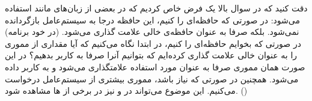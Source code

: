 دقت کنید که در سوال بالا یک فرض خاص کردیم که در بعضی از زبان‌های
مانند
استفاده می‌شود:
در صورتی که حافظه‌ای را
کنیم، این حافظه درجا به سیستم‌عامل بازگردانده نمی‌شود. بلکه صرفا
به عنوان حافظه‌ی خالی علامت گذاری می‌شود. (در خود برنامه) در صورتی که بخوایم حافظه‌ای را
کنیم، در ابتدا نگاه می‌کنیم که آیا مقداری از مموری را به عنوان خالی علامت گذاری کرده‌ایم
که بتوانیم آنرا صرفا به کاربر بدهیم؟ در این صورت همان مموری صرفا به عنوان مورد استفاده
علامتگذاری می‌شود و به کاربر داده می‌شود. همچنین در صورتی که نیاز باشد، مموری بیشتری از
سیستم‌عامل درخواست می‌کنیم. این موضوع می‌تواند در
 و 
نیز در برخی از
ها
مشاهده شود.
()



